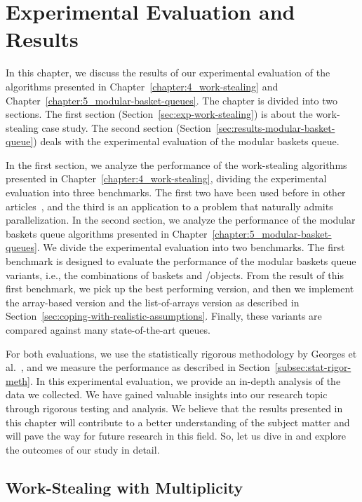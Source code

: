 \chapter{\label{chapter:6_Results}Experimental Evaluation and Results}

In this chapter, we discuss the results of our experimental evaluation of the algorithms presented in Chapter~\ref{chapter:4_work-stealing} and Chapter~\ref{chapter:5_modular-basket-queues}. The chapter is divided into two sections. The first section (Section~\ref{sec:exp-work-stealing}) is about the work-stealing case study. The second section (Section~\ref{sec:results-modular-basket-queue}) deals with the experimental evaluation of the modular baskets queue.

In the first section, we analyze the performance of the work-stealing algorithms presented in Chapter~\ref{chapter:4_work-stealing}, dividing the experimental evaluation into three benchmarks. The first two have been used before in other articles~\cite{DBLP_conf_pldi_FrigoLR98,maged.vechev.2009,fencefreework}, and the third is an application to a problem that naturally admits parallelization. In the second section, we analyze the performance of the modular baskets queue algorithms presented in Chapter~\ref{chapter:5_modular-basket-queues}. We divide the experimental evaluation into two benchmarks. The first benchmark is designed to evaluate the performance of the modular baskets queue variants, i.e., the combinations of baskets and \LL/\IC objects. From the result of this first benchmark, we pick up the best performing version, and then we implement the array-based version and the list-of-arrays version as described in Section~\ref{sec:coping-with-realistic-assumptions}. Finally, these variants are compared against many state-of-the-art queues.

For both evaluations, we use the statistically rigorous methodology by Georges et al.~\cite{DBLP_conf_oopsla_GeorgesBE07}, and we measure the performance as described in Section~\ref{subsec:stat-rigor-meth}. In this experimental evaluation, we provide an in-depth analysis of the data we collected. We have gained valuable insights into our research topic through rigorous testing and analysis. We believe that the results presented in this chapter will contribute to a better understanding of the subject matter and will pave the way for future research in this field. So, let us dive in and explore the outcomes of our study in detail.

\section{\label{sec:exp-work-stealing}Work-Stealing with Multiplicity}

